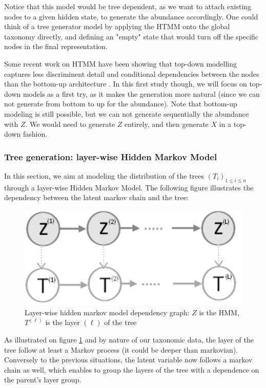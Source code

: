 Notice that this model would be tree dependent, as we want to attach existing nodes to a given hidden state, to generate
the abundance accordingly.
One could think of a tree generator model by applying the HTMM onto the global taxonomy directly, and defining an "empty"
state that would turn off the specific nodes in the final representation.

\medskip

Some recent work on HTMM have been showing that top-down modelling captures
less discriminent detail and conditional dependencies between the nodes than the bottom-up architecture \cite{bottom_up_superiority_hidden_tree_markov_models}.
In this first study though, we will focus on top-down models as a first try, as it makes the generation more natural (since we can not generate from bottom to up for the abundance).
Note that bottom-up modeling is still possible, but we can not generate sequentially the abundance with $Z$.
We would need to generate $Z$ entirely, and then generate $X$ in a top-down fashion.

\subsubsection{Tree generation: layer-wise Hidden Markov Model}

In this section, we aim at modeling the distribution of the trees $(T_i)_{1 \leq i \leq n}$ through a layer-wise Hidden Markov Model.
The following figure illustrates the dependency between the latent markov chain and the tree:
\begin{figure}[H]
    \centering
    \includegraphics[scale=.4]{images/layer_wise_hidden_markov_model_tree}
    \caption{Layer-wise hidden markov model dependency graph: $Z$ is the HMM, $T^{(\ell)}$ is the layer $(\ell)$ of the tree}
    \label{fig:layer_wise_hmm_tree}
\end{figure}

As illustrated on figure \ref{fig:layer_wise_hmm_tree} and by nature of our taxonomic data,
the layer of the tree follow at least a Markov process (it could be deeper than markovian).
Conversely to the previous situations, the latent variable now follows a markov chain as well, which enables to
group the layers of the tree with a dependence on the parent's layer group.

